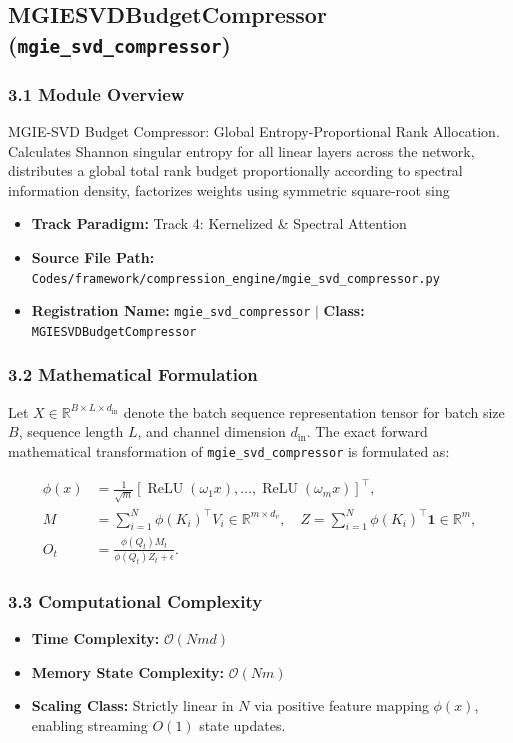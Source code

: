 \subsection{MGIESVDBudgetCompressor (\texttt{mgie\_svd\_compressor})}
\label{sec:app_module_mgie\_svd\_compressor}

\subsubsection*{3.1 Module Overview}
MGIE-SVD Budget Compressor: Global Entropy-Proportional Rank Allocation.  Calculates Shannon singular entropy for all linear layers across the network, distributes a global total rank budget proportionally according to spectral information density, factorizes weights using symmetric square-root sing
\begin{itemize}
    \item \textbf{Track Paradigm:} Track 4: Kernelized & Spectral Attention
    \item \textbf{Source File Path:} \texttt{Codes/framework/compression\_engine/mgie\_svd\_compressor.py}
    \item \textbf{Registration Name:} \texttt{mgie\_svd\_compressor} $\mid$ \textbf{Class:} \texttt{MGIESVDBudgetCompressor}
\end{itemize}

\subsubsection*{3.2 Mathematical Formulation}
Let $X \in \mathbb{R}^{B \times L \times d_{\text{in}}}$ denote the batch sequence representation tensor for batch size $B$, sequence length $L$, and channel dimension $d_{\text{in}}$. The exact forward mathematical transformation of \texttt{mgie\_svd\_compressor} is formulated as:

\begin{align}
\phi(x) &= \frac{1}{\sqrt{m}} \left[ \operatorname{ReLU}(\omega_1 x), \dots, \operatorname{ReLU}(\omega_m x) \right]^\top, \\
M &= \sum_{i=1}^N \phi(K_i)^\top V_i \in \mathbb{R}^{m \times d_v}, \quad Z = \sum_{i=1}^N \phi(K_i)^\top \mathbf{1} \in \mathbb{R}^m, \\
O_t &= \frac{\phi(Q_t) M_t}{\phi(Q_t) Z_t + \epsilon}.
\end{align}


\subsubsection*{3.3 Computational Complexity}
\begin{itemize}
    \item \textbf{Time Complexity:} $\mathcal{O}(N m d)$
    \item \textbf{Memory State Complexity:} $\mathcal{O}(N m)$
    \item \textbf{Scaling Class:} Strictly linear in $N$ via positive feature mapping $\phi(x)$, enabling streaming $O(1)$ state updates.
\end{itemize}

